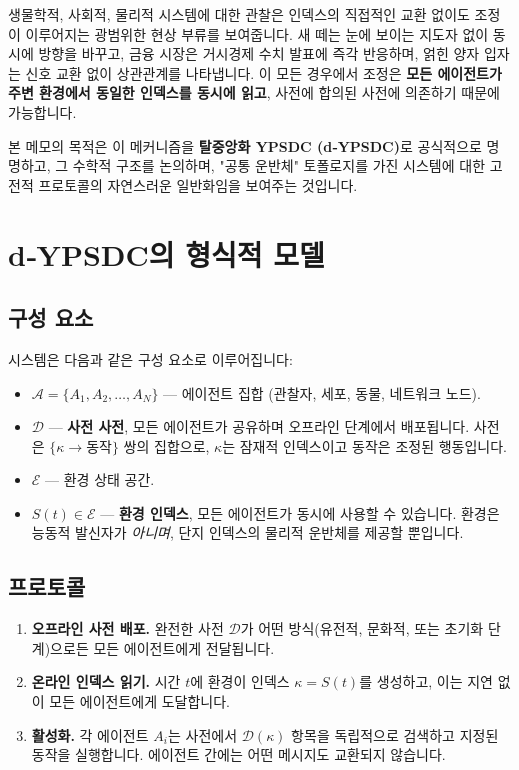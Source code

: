 \documentclass[11pt,a4paper]{article}
\begin{document}
	생물학적, 사회적, 물리적 시스템에 대한 관찰은 인덱스의 직접적인 교환 없이도 조정이 이루어지는 광범위한 현상 부류를 보여줍니다. 새 떼는 눈에 보이는 지도자 없이 동시에 방향을 바꾸고, 금융 시장은 거시경제 수치 발표에 즉각 반응하며, 얽힌 양자 입자는 신호 교환 없이 상관관계를 나타냅니다. 이 모든 경우에서 조정은 \textbf{모든 에이전트가 주변 환경에서 동일한 인덱스를 동시에 읽고}, 사전에 합의된 사전에 의존하기 때문에 가능합니다.
	
	본 메모의 목적은 이 메커니즘을 \textbf{탈중앙화 YPSDC (d‑YPSDC)}로 공식적으로 명명하고, 그 수학적 구조를 논의하며, "공통 운반체" 토폴로지를 가진 시스템에 대한 고전적 프로토콜의 자연스러운 일반화임을 보여주는 것입니다.
	
	\section{d‑YPSDC의 형식적 모델}
	
	\subsection{구성 요소}
	
	시스템은 다음과 같은 구성 요소로 이루어집니다:
	
	\begin{itemize}[leftmargin=*]
		\item \(\mathcal{A} = \{A_1, A_2, \dots, A_N\}\) — 에이전트 집합 (관찰자, 세포, 동물, 네트워크 노드).
		\item \(\mathcal{D}\) — \textbf{사전 사전}, 모든 에이전트가 공유하며 오프라인 단계에서 배포됩니다. 사전은 \(\{ \kappa \to \text{동작} \}\) 쌍의 집합으로, \(\kappa\)는 잠재적 인덱스이고 \(\text{동작}\)은 조정된 행동입니다.
		\item \(\mathcal{E}\) — 환경 상태 공간.
		\item \(S(t) \in \mathcal{E}\) — \textbf{환경 인덱스}, 모든 에이전트가 동시에 사용할 수 있습니다. 환경은 능동적 발신자가 \emph{아니며}, 단지 인덱스의 물리적 운반체를 제공할 뿐입니다.
	\end{itemize}
	
	\subsection{프로토콜}
	
	\begin{enumerate}[leftmargin=*, label=\textbf{단계 \arabic*:}]
		\item \textbf{오프라인 사전 배포.} 완전한 사전 \(\mathcal{D}\)가 어떤 방식(유전적, 문화적, 또는 초기화 단계)으로든 모든 에이전트에게 전달됩니다.
		\item \textbf{온라인 인덱스 읽기.} 시간 \(t\)에 환경이 인덱스 \(\kappa = S(t)\)를 생성하고, 이는 지연 없이 모든 에이전트에게 도달합니다.
		\item \textbf{활성화.} 각 에이전트 \(A_i\)는 사전에서 \(\mathcal{D}(\kappa)\) 항목을 독립적으로 검색하고 지정된 동작을 실행합니다. 에이전트 간에는 어떤 메시지도 교환되지 않습니다.
	\end{enumerate}
	
\end{document}
